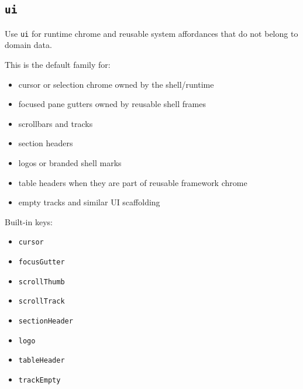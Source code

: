 \subsection{\texorpdfstring{\texttt{u\allowbreak{}i}}{}}\label{record-028-ui}

Use \texttt{u\allowbreak{}i} for runtime chrome and reusable system affordances that do not belong to domain data.

This is the default family for:

\begin{itemize}
\tightlist
\item
  cursor or selection chrome owned by the shell/runtime
\item
  focused pane gutters owned by reusable shell frames
\item
  scrollbars and tracks
\item
  section headers
\item
  logos or branded shell marks
\item
  table headers when they are part of reusable framework chrome
\item
  empty tracks and similar UI scaffolding
\end{itemize}

Built-in keys:

\begin{itemize}
\tightlist
\item
  \texttt{c\allowbreak{}u\allowbreak{}r\allowbreak{}s\allowbreak{}o\allowbreak{}r}
\item
  \texttt{f\allowbreak{}o\allowbreak{}c\allowbreak{}u\allowbreak{}s\allowbreak{}G\allowbreak{}u\allowbreak{}t\allowbreak{}t\allowbreak{}e\allowbreak{}r}
\item
  \texttt{s\allowbreak{}c\allowbreak{}r\allowbreak{}o\allowbreak{}l\allowbreak{}l\allowbreak{}T\allowbreak{}h\allowbreak{}u\allowbreak{}m\allowbreak{}b}
\item
  \texttt{s\allowbreak{}c\allowbreak{}r\allowbreak{}o\allowbreak{}l\allowbreak{}l\allowbreak{}T\allowbreak{}r\allowbreak{}a\allowbreak{}c\allowbreak{}k}
\item
  \texttt{s\allowbreak{}e\allowbreak{}c\allowbreak{}t\allowbreak{}i\allowbreak{}o\allowbreak{}n\allowbreak{}H\allowbreak{}e\allowbreak{}a\allowbreak{}d\allowbreak{}e\allowbreak{}r}
\item
  \texttt{l\allowbreak{}o\allowbreak{}g\allowbreak{}o}
\item
  \texttt{t\allowbreak{}a\allowbreak{}b\allowbreak{}l\allowbreak{}e\allowbreak{}H\allowbreak{}e\allowbreak{}a\allowbreak{}d\allowbreak{}e\allowbreak{}r}
\item
  \texttt{t\allowbreak{}r\allowbreak{}a\allowbreak{}c\allowbreak{}k\allowbreak{}E\allowbreak{}m\allowbreak{}p\allowbreak{}t\allowbreak{}y}
\end{itemize}

